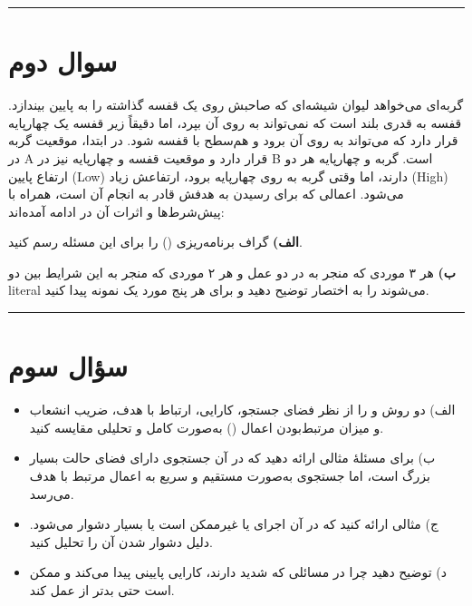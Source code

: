 \documentclass[a4paper,10pt]{article}
\begin{document}
\bigskip
\bigskip
\rule{\linewidth}{0.4pt}

\section{سوال دوم}

گربه‌ای می‌خواهد لیوان شیشه‌ای که صاحبش روی یک قفسه گذاشته را به پایین بیندازد.  
قفسه به قدری بلند است که نمی‌تواند به روی آن بپرد، اما دقیقاً زیر قفسه یک چهارپایه قرار دارد که می‌تواند به روی آن برود و هم‌سطح با قفسه شود.  
در ابتدا، موقعیت گربه در A قرار دارد و موقعیت قفسه و چهارپایه نیز در B است.  
گربه و چهارپایه هر دو ارتفاع پایین (Low) دارند، اما وقتی گربه به روی چهارپایه برود، ارتفاعش زیاد (High) می‌شود.  
اعمالی که برای رسیدن به هدفش قادر به انجام آن است، همراه با پیش‌شرط‌ها و اثرات آن در ادامه آمده‌اند:

\bigskip

\bigskip

\noindent\textbf{الف)} گراف برنامه‌ریزی () را برای این مسئله رسم کنید.  

\bigskip

\noindent\textbf{ب)}  
هر ۳ موردی که منجر به  در دو عمل 
و هر ۲ موردی که منجر به این شرایط بین دو literal می‌شوند  
را به اختصار توضیح دهید و برای هر پنج مورد یک نمونه  پیدا کنید. 

\bigskip
\bigskip
\rule{\linewidth}{0.4pt}

\section{سؤال سوم }

\begin{itemize}

\item
الف) دو روش  و  را از نظر فضای جستجو، کارایی، ارتباط با هدف، ضریب انشعاب و میزان مرتبط‌بودن اعمال () به‌صورت کامل و تحلیلی مقایسه کنید.

\item
ب) برای مسئلهٔ  مثالی ارائه دهید که در آن جستجوی  دارای فضای حالت بسیار بزرگ است، اما جستجوی  به‌صورت مستقیم و سریع به اعمال مرتبط با هدف می‌رسد.

\item
ج) مثالی ارائه کنید که در آن اجرای  یا غیرممکن است یا بسیار دشوار می‌شود. دلیل دشوار شدن آن را تحلیل کنید.

\item
د) توضیح دهید چرا  در مسائلی که  شدید دارند، کارایی پایینی پیدا می‌کند و ممکن است حتی بدتر از  عمل کند.

\end{itemize}
\end{document}
